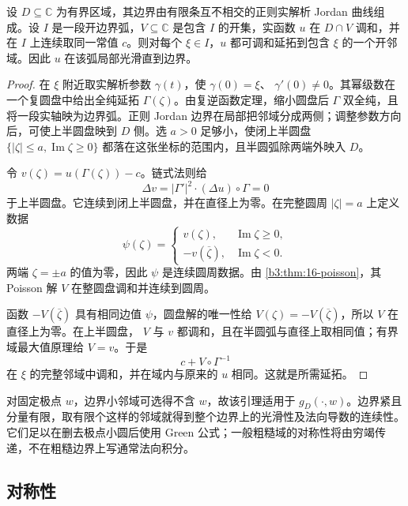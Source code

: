 \begin{lemma}[常边值调和函数的局部反射]\label{b3:lem:17-harmonic-reflection}
设 \(D\subseteq\mathbb C\) 为有界区域，其边界由有限条互不相交的正则实解析 Jordan 曲线组成。设 \(I\) 是一段开边界弧，\(V\subseteq\mathbb C\) 是包含 \(I\) 的开集，实函数 \(u\) 在 \(D\cap V\) 调和，并在 \(I\) 上连续取同一常值 \(c\)。则对每个 \(\xi\in I\)，\(u\) 都可调和延拓到包含 \(\xi\) 的一个开邻域。因此 \(u\) 在该弧局部光滑直到边界。
\end{lemma}
\begin{proof}
在 \(\xi\) 附近取实解析参数 \(\gamma(t)\)，使 \(\gamma(0)=\xi\)、
\(\gamma'(0)\ne0\)。其幂级数在一个复圆盘中给出全纯延拓
\(\Gamma(\zeta)\)。由复逆函数定理，缩小圆盘后 \(\Gamma\) 双全纯，且将一段实轴映为边界弧。正则 Jordan 边界在局部把邻域分成两侧；调整参数方向后，可使上半圆盘映到 \(D\) 侧。选 \(a>0\) 足够小，使闭上半圆盘
\(\{|\zeta|\le a,\operatorname{Im}\zeta\ge0\}\) 都落在这张坐标的范围内，且半圆弧除两端外映入 \(D\)。

令 \(v(\zeta)=u(\Gamma(\zeta))-c\)。链式法则给
\[
 \Delta v=|\Gamma'|^2\cdot(\Delta u)\circ\Gamma=0
\]
于上半圆盘。它连续到闭上半圆盘，并在直径上为零。在完整圆周
\(|\zeta|=a\) 上定义数据
\[
 \psi(\zeta)=
 \begin{cases}
 v(\zeta),&\operatorname{Im}\zeta\ge0,\\
 -v(\overline\zeta),&\operatorname{Im}\zeta<0.
 \end{cases}
\]
两端 \(\zeta=\pm a\) 的值为零，因此 \(\psi\) 是连续圆周数据。由
\cref{b3:thm:16-poisson}，其 Poisson 解 \(V\) 在整圆盘调和并连续到圆周。

函数 \(-V(\overline\zeta)\) 具有相同边值 \(\psi\)，圆盘解的唯一性给
\(V(\zeta)=-V(\overline\zeta)\)，所以 \(V\) 在直径上为零。在上半圆盘，
\(V\) 与 \(v\) 都调和，且在半圆弧与直径上取相同值；有界域最大值原理给
\(V=v\)。于是
\[
 c+V\circ\Gamma^{-1}
\]
在 \(\xi\) 的完整邻域中调和，并在域内与原来的 \(u\) 相同。这就是所需延拓。
\end{proof}

对固定极点 \(w\)，边界小邻域可选得不含 \(w\)，故该引理适用于
\(g_D(\cdot,w)\)。边界紧且分量有限，取有限个这样的邻域就得到整个边界上的光滑性及法向导数的连续性。它们足以在删去极点小圆后使用 Green 公式；一般粗糙域的对称性将由穷竭传递，不在粗糙边界上写通常法向积分。

\subsection{对称性}
\label{b3:subsec:170103}

